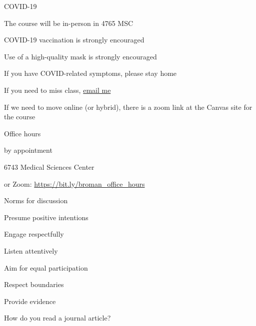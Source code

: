 \documentclass[aspectratio=169,12pt,t]{beamer}
\begin{document}
\begin{frame}{COVID-19}

  \bbi
\item The course will be in-person in 4765 MSC
\item COVID-19 vaccination is strongly encouraged
\item Use of a high-quality mask is strongly encouraged
\item If you have COVID-related symptoms, please stay home
\item If you need to miss class, \href{mailto:broman@wisc.edu}{email me}
\item If we need to move online (or hybrid), there is a zoom link at
  the Canvas site for the course
  \ei

\end{frame}




\begin{frame}{Office hours}

  \bbi
\item {\hilit by appointment}
\item 6743 Medical Sciences Center
\item or Zoom: \url{https://bit.ly/broman_office_hours}
\ei

\end{frame}






\begin{frame}{Norms for discussion}

      \bbi
    \item Presume positive intentions
    \item Engage respectfully
    \item Listen attentively
    \item Aim for equal participation
    \item Respect boundaries
    \item Provide evidence
      \ei

\end{frame}




\begin{frame}[c]{}

\centerline{\Large \color{title} How do you read a journal article?}

\end{frame}
\end{document}
